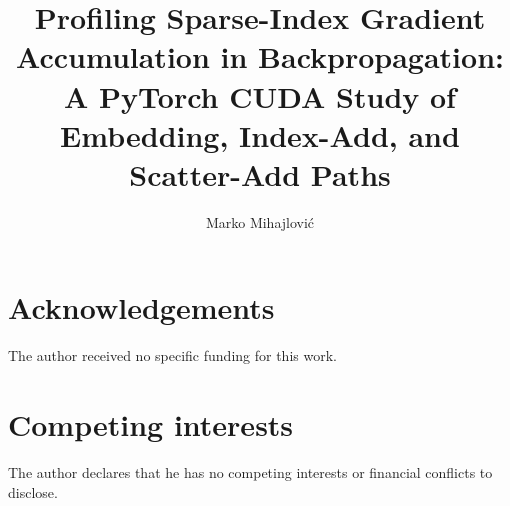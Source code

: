 \documentclass[research]{fcs}
\title{Profiling Sparse-Index Gradient Accumulation in Backpropagation: A PyTorch CUDA Study of Embedding, Index-Add, and Scatter-Add Paths}
\author[1,+]{Marko Mihajlović}
\begin{document}







\section*{Acknowledgements}
The author received no specific funding for this work.

\section*{Competing interests}
The author declares that he has no competing interests or financial conflicts to disclose.



\end{document}
